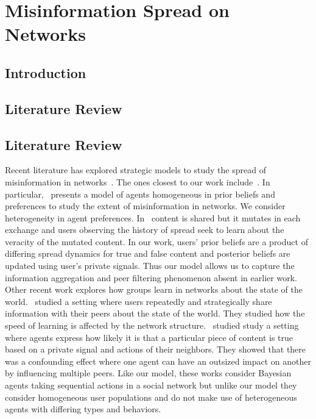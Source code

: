 \chapter{Misinformation Spread on Networks}\label{ch:misinfo}

\section{Introduction}

\section{Literature Review}

\section{Literature Review\label{sec:liter}} 
 Recent literature has explored strategic models to study the spread of misinformation in networks~\cite{sikder2020minimalistic, acemoglu2021model, jackson2022learning,mostagir2023social,bloch2018rumors, kranton2024social}. The ones closest to our work include~\cite{jackson2022learning, acemoglu2021model}. In particular,~\cite{acemoglu2021model} presents a model of agents homogeneous in prior beliefs and preferences to study the extent of misinformation in networks. We consider heterogeneity in agent preferences. In~\cite{jackson2022learning} content is shared but it mutates in each exchange and users observing the history of spread seek to learn about the veracity of the mutated content. In our work, users' prior beliefs are a product of differing spread dynamics for true and false content and posterior beliefs are updated using user's private signals. Thus our model allows us to capture the information aggregation and peer filtering phenomenon absent in earlier work.
Other recent work explores how groups learn in networks about the state of the world.~\cite{huang2024learning} studied a setting where users repeatedly and strategically share information with their peers about the state of the world. They studied how the speed of learning is affected by the network structure.~\cite{dasaratha2019aggregative} studied study a setting where agents express how likely it is that a particular piece of content is true based on a private signal and actions of their neighbors. They showed that there was a confounding effect where one agent can have an outsized impact on another by influencing multiple peers. Like our model, these works consider Bayesian agents taking sequential actions in a social network but unlike our model they consider homogeneous user populations and do not make use of heterogeneous agents with differing types and  behaviors.  

